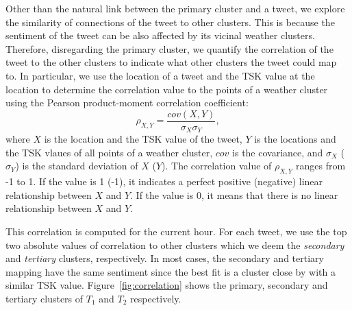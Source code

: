 
Other than the natural link between the primary cluster and a tweet, we explore the similarity of connections of the tweet to other clusters. %
This is because the sentiment of the tweet can be also affected by its vicinal weather clusters. Therefore, disregarding the primary cluster, we quantify the correlation of the tweet to the other clusters to indicate what other clusters the tweet could map to. In particular, we use the location of a tweet and the TSK value at the location to determine the correlation value to the points of a weather cluster using the Pearson product-moment correlation coefficient:
\begin{equation}
\label{eq:pearson}
\rho_{X,Y}=\frac{cov(X,Y)}{\sigma_{X}\sigma_{Y}},
\end{equation}
where $X$ is the location and the TSK value of the tweet, $Y$ is the locations and the TSK vlaues of all points of a weather cluster, $cov$ is the covariance, and $\sigma_{X}$ ($\sigma_{Y}$) is the standard deviation of $X$ ($Y$). The correlation value of $\rho_{X,Y}$ ranges from -1 to 1. If the value is 1 (-1), it indicates a perfect positive (negative) linear relationship between $X$ and $Y$. If the value is 0, it means that there is no linear relationship between $X$ and $Y$.

This correlation is computed for the current hour. For each tweet, we use the top two absolute values of correlation to other clusters which we deem the \emph{secondary} and \emph{tertiary} clusters, respectively. In most cases, the secondary and tertiary mapping have the same sentiment since the best fit is a cluster close by with a similar TSK value. Figure~\ref{fig:correlation} shows the primary, secondary and tertiary clusters of $T_1$ and $T_2$ respectively.



